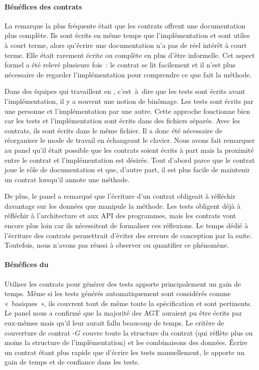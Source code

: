 \paragraph{Bénéfices des contrats} La remarque la plus fréquente était que les
con\-trats offrent une documentation plus complète. Ils sont écrits en même
temps que l'implémentation et sont utiles à court terme, alors qu'écrire une
documentation n'a pas de réel intérêt à court terme. Elle était rarement
écrite ou complète en plus d'être informelle. Cet aspect formel a été relevé
plusieurs fois~: le contrat se lit facilement et il n'est plus nécessaire de
regarder l'implémentation pour comprendre ce que fait la méthode.

Dans des équipes qui travaillent en ,
c'est~à~dire que les tests sont écrits avant l'implémentation, il y a souvent
une notion de binômage. Les tests sont écrits par une personne et
l'implémentation par une autre. Cette approche fonctionne bien car les tests et
l'implémentation sont écrits dans des fichiers séparés. Avec les contrats, ils
sont écrits dans le même fichier. Il a donc été nécessaire de réorganiser le
mode de travail en échangeant le clavier. Nous avons fait remarquer au panel
qu'il était possible que les contrats soient écrits à part mais la proximité
entre le contrat et l'implémentation est désirée. Tout d'abord parce que le
contrat joue le rôle de documentation et que, d'autre part, il est plus facile
de maintenir un contrat lorsqu'il annote une méthode.

De plus, le panel a remarqué que l'écriture d'un contrat obligeait à réfléchir
davantage sur les données que manipule la méthode. Les tests obligent déjà à
réfléchir à l'architecture et aux API des programmes, mais les contrats vont
encore plus loin car ils nécessitent de formaliser ces réflexions. Le temps
dédié à l'écriture des contrats permettrait d'éviter des erreurs de conception
par la suite. Toutefois, nous n'avons pas réussi à observer ou quantifier ce
phénomène.

\paragraph{Bénéfices du } Utiliser les
contrats pour générer des tests apporte principalement un gain de temps. Même si
les tests générés automatiquement sont considérés comme «~basiques~», ils
couvrent tout de même toute la spécification et sont pertinents. Le panel nous a
confirmé que la majorité des AGT auraient pu être écrits par eux-mêmes mais
qu'il leur aurait fallu beaucoup de temps. Le critère de couverture de contrat
-$G$ couvre toute la structure du contrat (qui réflète plus ou
moins la structure de l'implémentation) et les combinaisons des données. Écrire
un contrat étant plus rapide que d'écrire les tests manuellement, le
 apporte un gain de temps et de confiance dans
les tests.

